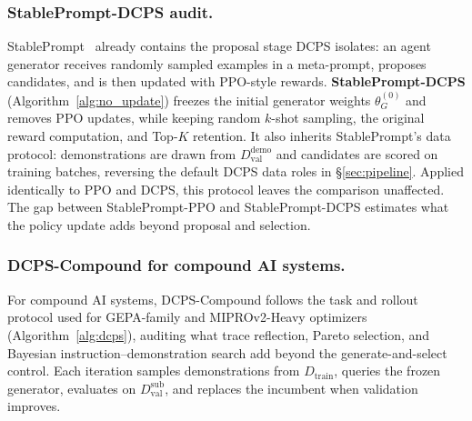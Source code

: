 \documentclass[runningheads]{llncs}
\begin{document}
\subsubsection{StablePrompt-DCPS audit.}
StablePrompt~\cite{kwon2024stableprompt} already contains the proposal stage DCPS isolates: an agent generator receives randomly sampled examples in a meta-prompt, proposes candidates, and is then updated with PPO-style rewards. \textbf{StablePrompt-DCPS} (Algorithm~\ref{alg:no_update}) freezes the initial generator weights $\theta_G^{(0)}$ and removes PPO updates, while keeping random $k$-shot sampling, the original reward computation, and Top-$K$ retention. It also inherits StablePrompt's data protocol: demonstrations are drawn from $D_{\mathrm{val}}^{\mathrm{demo}}$ and candidates are scored on training batches, reversing the default DCPS data roles in \S\ref{sec:pipeline}. Applied identically to PPO and DCPS, this protocol leaves the comparison unaffected. The gap between StablePrompt-PPO and StablePrompt-DCPS estimates what the policy update adds beyond proposal and selection.

\subsubsection{DCPS-Compound for compound AI systems.}
For compound AI systems, DCPS-Compound follows the task and rollout protocol used for GEPA-family and MIPROv2-Heavy optimizers~\cite{gepa,opsahl2024mipro} (Algorithm~\ref{alg:dcps}), auditing what trace reflection, Pareto selection, and Bayesian instruction--demonstration search add beyond the generate-and-select control. Each iteration samples demonstrations from $D_{\mathrm{train}}$, queries the frozen generator, evaluates on $D_{\mathrm{val}}^{\mathrm{sub}}$, and replaces the incumbent when validation improves.
\end{document}
